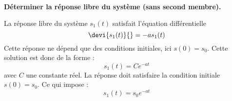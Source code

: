 \question{}                                                                                                                               
\textbf{Déterminer la réponse libre du système (sans second membre).}                                                                     
                                                                                                                                          
La réponse libre du système $s_1(t)$ satisfait l'équation différentielle                                                                  
$$                                                                                                                                        
\devi{s_1(t)}{}=-as_1(t)                                                                                                                  
$$                                                                                                                                        
Cette réponse ne dépend que des conditions initiales, ici $s(0)=s_0$.                                                                     
Cette solution est donc de la forme :                                                                                                     
$$                                                                                                                                        
s_1(t)=Ce^{-at}                                                                                                                           
$$                                                                                                                                        
avec $C$ une constante réel. La réponse doit satisfaire la condition initiale $s(0)=s_0$.                                                 
Ce qui impose :                                                                                                                           
$$                                                                                                                                        
s_1(t)=s_0e^{-at}                                                                                                                         
$$                                                                                                                                        
                                                                                                                                          
\question{}                                                                                                                               
                                                                                                                                          
